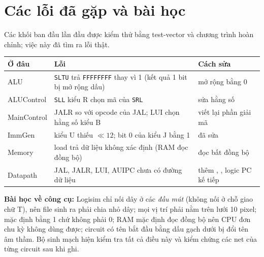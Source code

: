 \documentclass[11pt,a4paper]{article}
\newcommand{\sig}[1]{\texttt{\detokenize{#1}}}
\begin{document}
\section{Các lỗi đã gặp và bài học}
Các khối ban đầu lần đầu được kiểm thử bằng test-vector và chương trình hoàn chỉnh; việc này đã tìm ra lỗi thật.
\begin{center}
\small
\begin{tabularx}{\textwidth}{@{}>{\raggedright\arraybackslash}p{2.6cm}>{\raggedright\arraybackslash}p{7.2cm}X@{}}
\toprule
\textbf{Ở đâu} & \textbf{Lỗi} & \textbf{Cách sửa}\\
\midrule
ALU & \texttt{SLTU} trả \texttt{FFFFFFFF} thay vì 1 (kết quả 1 bit bị mở rộng dấu) & mở rộng bằng 0\\
ALUControl & \texttt{SLL} kiểu R chọn mã của \texttt{SRL} & sửa hằng số\\
MainControl & JALR so với opcode của JAL; LUI chọn hằng số kiểu B & viết lại phần giải mã\\
ImmGen & kiểu U thiếu $\ll12$; bit 0 của kiểu J bằng 1 & đã sửa\\
Memory & load trả dữ liệu không xác định (RAM đọc đồng bộ) & đọc bất đồng bộ\\
Datapath & JAL, JALR, LUI, AUIPC chưa có đường dữ liệu & thêm \sig{ASel}, \sig{WBSel}, logic PC kế tiếp\\
\bottomrule
\end{tabularx}
\end{center}
\textbf{Bài học về công cụ:} Logisim chỉ nối dây ở các \emph{đầu mút} (không nối ở chỗ giao chữ T), nên file sinh ra phải chia nhỏ dây; mọi vị trí phải nằm trên lưới 10 pixel; \sig{Constant} mặc định bằng 1 chứ không phải 0;
RAM mặc định đọc đồng bộ nên CPU đơn chu kỳ không dùng được; circuit có tên bắt đầu bằng dấu gạch dưới bị đổi tên âm thầm. Bộ sinh mạch hiện kiểm tra tất cả điều này và kiểm chứng các net của từng circuit sau khi ghi.

\end{document}
